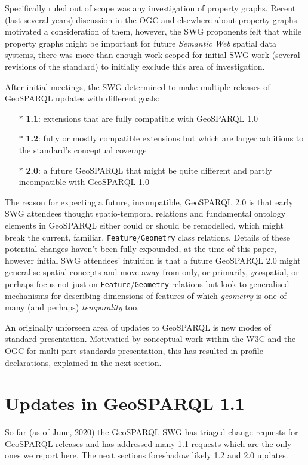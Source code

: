 \documentclass[runningheads]{llncs}
\begin{document}
Specifically ruled out of scope was any investigation of property graphs. Recent (last several years) discussion in the OGC and 
elsewhere about property graphs motivated a consideration of them, however, the SWG proponents felt that while property graphs might 
be important for future \textit{Semantic Web} spatial data systems, there was more than enough work scoped for initial SWG work
(several revisions of the standard) to initially exclude this area of investigation.

After initial meetings, the SWG determined to make multiple releases of GeoSPARQL updates with different goals:

\begin{itemize}
    \item[$\ast$] \textbf{1.1}: extensions that are fully compatible with GeoSPARQL 1.0
    \item[$\ast$] \textbf{1.2}: fully or mostly compatible extensions but which are larger additions to the standard's conceptual coverage
    \item[$\ast$] \textbf{2.0}: a future GeoSPARQL that might be quite different and partly incompatible with GeoSPARQL 1.0
\end{itemize} 

The reason for expecting a future, incompatible, GeoSPARQL 2.0 is that early SWG attendees thought spatio-temporal relations
and fundamental ontology elements in GeoSPARQL either could or should be remodelled, which might break the current, familiar, 
\texttt{Feature}/\texttt{Geometry} class relations. Details of these potential changes haven't been fully expounded, at the 
time of this paper, however initial SWG attendees' intuition is that a future GeoSPARQL 2.0 might generalise spatial concepts and
move away from only, or primarily, \textit{geo}spatial, or perhaps focus not just on \texttt{Feature}/\texttt{Geometry} relations
but look to generalised mechanisms for describing dimensions of features of which \textit{geometry} is one of many (and perhaps)
\textit{temporality} too.

An originally unforseen area of updates to GeoSPARQL is new modes of standard presentation. Motivatied by conceptual work within the W3C and the OGC for  
multi-part standards presentation, this has resulted in profile declarations, explained 
in the next section.


\section{Updates in GeoSPARQL 1.1}\label{sec:newfeatures}
So far (as of June, 2020) the GeoSPARQL SWG has triaged change requests for GeoSPARQL releases and has addressed
many 1.1 requests which are the only ones we report here. The next sections foreshadow likely 1.2 and 2.0 updates.
\end{document}
